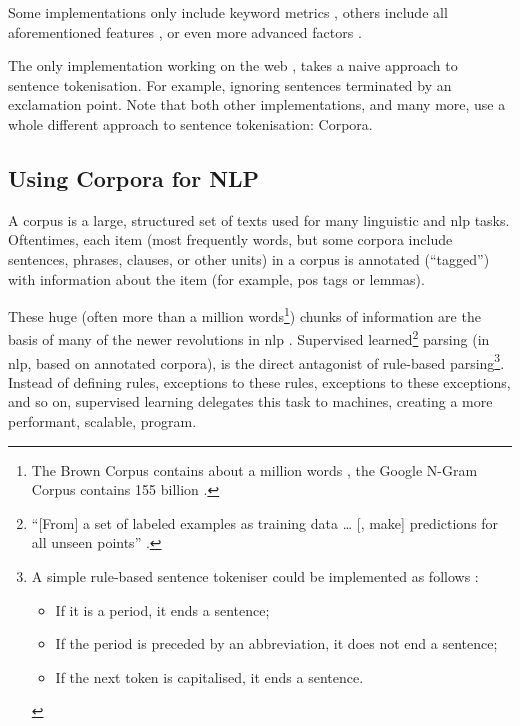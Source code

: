 Some implementations only include keyword metrics
\autocite{jbrooksuk/node-summary-source-code}, others include all
aforementioned features \autocite{MojoJolo/textteaser-source-code}, or
even more advanced factors \autocite{summly}.

The only implementation working on the web
\autocite{jbrooksuk/node-summary-source-code}, takes a naive approach to
sentence tokenisation. For example, ignoring sentences terminated by an
exclamation point. Note that both other implementations, and many more,
use a whole different approach to sentence tokenisation: Corpora.

\subsection{Using Corpora for NLP}\label{using-corpora-for}

A corpus is a large, structured set of texts used for many linguistic
and \gls{nlp} tasks. Oftentimes, each item (most frequently words, but
some corpora include sentences, phrases, clauses, or other units) in a
corpus is annotated (``tagged'') with information about the item (for
example, \gls{pos} tags or lemmas).

These huge (often more than a million words\footnote{The Brown Corpus
  contains about a million words \autocite{francis-nelson-brown-corpus},
  the Google N-Gram Corpus contains 155 billion
  \autocite{brants-thorsten-google-ngram-corpus}.}) chunks of
information are the basis of many of the newer revolutions in \gls{nlp}
\autocite[see][]{mitkov-ruslan-ea-importance-corpora}. Supervised
learned\footnote{``{[}From{]} a set of labeled examples as training data
  \ldots{} {[}, make{]} predictions for all unseen points''
  \autocite{mohri-mehryar-foundations-machine-learning}.} parsing (in
\gls{nlp}, based on annotated corpora), is the direct antagonist of
rule-based parsing\footnote{A simple rule-based sentence tokeniser could
  be implemented as follows
  \autocite{attivio.com-doing-things-with-sentences}:

  \begin{itemize}
  \itemsep1pt\parskip0pt
  \item
    If it is a period, it ends a sentence;
  \item
    If the period is preceded by an abbreviation, it does not end a
    sentence;
  \item
    If the next token is capitalised, it ends a sentence.
  \end{itemize}}. Instead of defining rules, exceptions to these rules,
exceptions to these exceptions, and so on, supervised learning delegates
this task to machines, creating a more performant, scalable, program.

